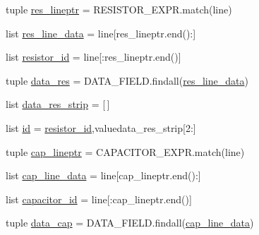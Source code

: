 \begin{DoxyCompactItemize}
\item 
tuple \hyperlink{classsage__circuit__analysis_1_1SmallSignalLinearCircuit_a429f5b11846e8c6d6aec2e53d1cd4db7}{res\-\_\-lineptr} = R\-E\-S\-I\-S\-T\-O\-R\-\_\-\-E\-X\-P\-R.\-match(line)
\item 
list \hyperlink{classsage__circuit__analysis_1_1SmallSignalLinearCircuit_a46746c7471ab6b7d6cf9c971a1f4482c}{res\-\_\-line\-\_\-data} = line\mbox{[}res\-\_\-lineptr.\-end()\-:\mbox{]}
\item 
list \hyperlink{classsage__circuit__analysis_1_1SmallSignalLinearCircuit_aafd92208ecc409ca26df39d085191cfe}{resistor\-\_\-id} = line\mbox{[}\-:res\-\_\-lineptr.\-end()\mbox{]}
\item 
tuple \hyperlink{classsage__circuit__analysis_1_1SmallSignalLinearCircuit_ab7ea0c010477e7f5e6437df84968481e}{data\-\_\-res} = D\-A\-T\-A\-\_\-\-F\-I\-E\-L\-D.\-findall(\hyperlink{classsage__circuit__analysis_1_1SmallSignalLinearCircuit_a46746c7471ab6b7d6cf9c971a1f4482c}{res\-\_\-line\-\_\-data})
\item 
list \hyperlink{classsage__circuit__analysis_1_1SmallSignalLinearCircuit_a3a9a6dfb6208d84920f57da4def51bd7}{data\-\_\-res\-\_\-strip} = \mbox{[}$\,$\mbox{]}
\item 
list \hyperlink{classsage__circuit__analysis_1_1SmallSignalLinearCircuit_af96e861cd3bbea68a6a29fee525a593c}{id} = \hyperlink{classsage__circuit__analysis_1_1SmallSignalLinearCircuit_aafd92208ecc409ca26df39d085191cfe}{resistor\-\_\-id},valuedata\-\_\-res\-\_\-strip\mbox{[}2\-:\mbox{]}
\item 
tuple \hyperlink{classsage__circuit__analysis_1_1SmallSignalLinearCircuit_a07da7f8ba546601c47d6a1b7354fe5cd}{cap\-\_\-lineptr} = C\-A\-P\-A\-C\-I\-T\-O\-R\-\_\-\-E\-X\-P\-R.\-match(line)
\item 
list \hyperlink{classsage__circuit__analysis_1_1SmallSignalLinearCircuit_a1f2f8638bd60e5047abeeaeac630fcf2}{cap\-\_\-line\-\_\-data} = line\mbox{[}cap\-\_\-lineptr.\-end()\-:\mbox{]}
\item 
list \hyperlink{classsage__circuit__analysis_1_1SmallSignalLinearCircuit_aac5fa5ade85f5cdb7fa2cd57c58acea0}{capacitor\-\_\-id} = line\mbox{[}\-:cap\-\_\-lineptr.\-end()\mbox{]}
\item 
tuple \hyperlink{classsage__circuit__analysis_1_1SmallSignalLinearCircuit_a73d1263036c6955af8d9ae5b1c17344b}{data\-\_\-cap} = D\-A\-T\-A\-\_\-\-F\-I\-E\-L\-D.\-findall(\hyperlink{classsage__circuit__analysis_1_1SmallSignalLinearCircuit_a1f2f8638bd60e5047abeeaeac630fcf2}{cap\-\_\-line\-\_\-data})
\item 

\end{DoxyCompactItemize}
